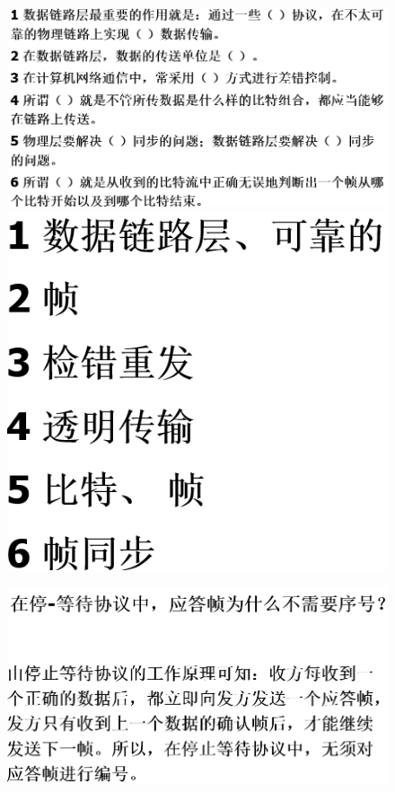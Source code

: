 \documentclass[UTF8,a4paper]{ctexart}
\begin{document}
\begin{figure}[H]
  \centering
  \includegraphics[scale = 0.3]{assets/jisuanjiwangluo_1d115.png}
  \includegraphics[scale = 0.15]{assets/jisuanjiwangluo_af4a9.png}
\end{figure}

\begin{figure}[H]
  \centering
  \includegraphics[scale = 0.3]{assets/jisuanjiwangluo_aa2b2.png}
\end{figure}
\end{document}
